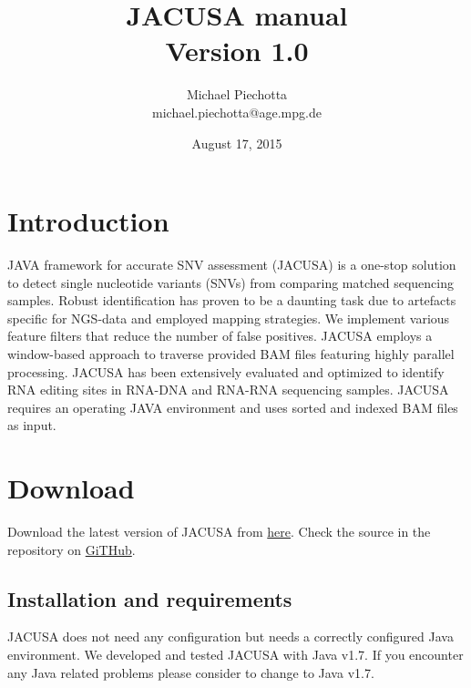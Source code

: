 \documentclass[10pt, a4paper]{article}
\title{JACUSA manual \\ Version 1.0}
\author{Michael Piechotta \\ michael.piechotta@age.mpg.de}
\date{August 17, 2015}
\begin{document}
\maketitle \tableofcontents
\section{Introduction}
JAVA framework for accurate SNV assessment (JACUSA) is a one-stop solution to detect single
nucleotide variants (SNVs) from comparing matched sequencing samples. Robust identification has
proven to be a daunting task due to artefacts specific for NGS-data and employed mapping
strategies. We implement various feature filters that reduce the number of false positives. JACUSA
employs a window-based approach to traverse provided BAM files featuring highly parallel processing.
JACUSA has been extensively evaluated and optimized to identify RNA editing sites in RNA-DNA and
RNA-RNA sequencing samples. JACUSA requires an operating JAVA environment and uses sorted and
indexed BAM files as input.
\section{Download}
Download the latest version of JACUSA from \href{http://www.age.mpg.de/software/jacusa/latest.tar.gz}{here}.
Check the source in the repository on
\href{https://github.com/dieterich-lab/JACUSA}{GiTHub}.
\subsection{Installation and requirements}
JACUSA does not need any configuration but needs a correctly configured Java environment.
We developed and tested JACUSA with Java v1.7. If you encounter any Java related problems please
consider to change to Java v1.7.
\end{document}

